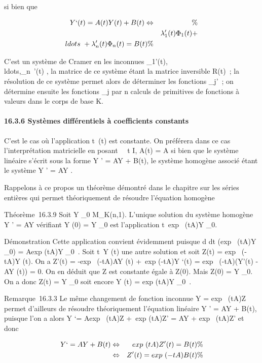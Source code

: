 si bien que

\begin{align*} Y `(t) = A(t)Y (t) + B(t)
\Leftrightarrow&& \%& \\
& & \lambda_1'(t)\Phi_1(t) +
\\ldots~ +
\lambda_n'(t)\Phi_n(t) = B(t)\%&
\\ \end{align*}

C'est un système de Cramer en les inconnues
\lambda_1'(t),\\ldots,\lambda_n~'(t)
, la matrice de ce système étant la matrice inversible R(t)~; la
résolution de ce système permet alors de déterminer les fonctions
\lambda_j'~; on détermine ensuite les fonctions \lambda_j par n
calculs de primitives de fonctions à valeurs dans le corps de base K.

\paragraph{16.3.6 Systèmes différentiels à coefficients constants}

C'est le cas où l'application t\mapsto~\ell(t) est
constante. On préférera dans ce cas l'interprétation matricielle en
posant \forall~~t \in I, A(t) = A si bien que le système
linéaire s'écrit sous la forme Y ' = AY + B(t), le système homogène
associé étant le système Y ' = AY .

Rappelons à ce propos un théorème démontré dans le chapitre sur les
séries entières qui permet théoriquement de résoudre l'équation homogène

Théorème~16.3.9 Soit Y _0 \in M_K(n,1). L'unique
solution du système homogène Y ' = AY vérifiant Y (0) = Y _0
est l'application
t\mapsto~exp~ (tA)Y
_0.

Démonstration Cette application convient évidemment puisque  d
\over dt (exp~ (tA)Y
_0) = Aexp (tA)Y _0~. Soit
t\mapsto~Y (t) une autre solution et soit Z(t)
= exp~ (-tA)Y (t). On a Z'(t) =
-exp~ (-tA)AY (t) +\
exp (-tA)Y `(t) = exp~ (-tA)(Y'(t) - AY (t))
= 0. On en déduit que Z est constante égale à Z(0). Mais Z(0) = Y
_0. On a donc Z(t) = Y _0 soit encore Y (t)
= exp (tA)Y _0~.

Remarque~16.3.3 Le même changement de fonction inconnue Y
= exp~ (tA)Z permet d'ailleurs de résoudre
théoriquement l'équation linéaire Y ' = AY + B(t), puisque l'on a alors
Y `= Aexp~ (tA)Z +\
exp (tA)Z' = AY + exp~ (tA)Z' et donc

\begin{align*} Y `= AY + B(t)&
\Leftrightarrow & exp~ (tA)Z'(t)
= B(t) \%& \\ &
\Leftrightarrow & Z'(t) = exp~
(-tA)B(t)\%& \\
\end{align*}

